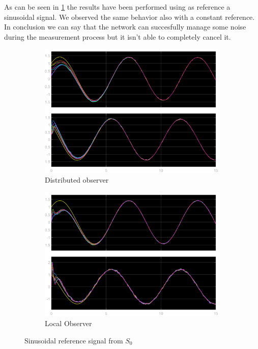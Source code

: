 As can be seen in \ref{fig:SBVF} the results have been performed using as reference a sinusoidal signal.
We observed the same behavior also with a constant reference.
In conclusion we can say that the network can succesfully manage some noise during the measurement process 
but it isn't able to completely cancel it.

\begin{figure}[H]
    \begin{subfigure}{0.45\textwidth}
        \centering
        \includegraphics[width=\textwidth]{img/dist/dist_SBVF.png}
        \caption{Distributed observer}
    \end{subfigure}
    \hfill
    \begin{subfigure}{0.45\textwidth}
        \centering
        \includegraphics[width=\textwidth]{img/local/local_SBVF.png}
        \caption{Local Observer}
    \end{subfigure}
    \caption{Sinusoidal reference signal from $S_0$}
    \label{fig:SBVF}
\end{figure}